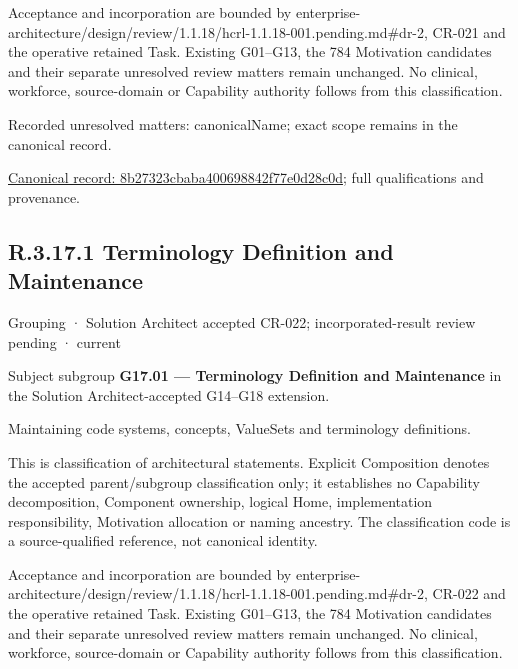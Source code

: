 Acceptance and incorporation are bounded by enterprise-architecture/design/review/1.1.18/hcrl-1.1.18-001.pending.md\#dr-2, CR-021 and the operative retained Task. Existing G01–G13, the 784 Motivation candidates and their separate unresolved review matters remain unchanged. No clinical, workforce, source-domain or Capability authority follows from this classification.


{\small Recorded unresolved matters: canonicalName; exact scope remains in the canonical record.}\par
{\footnotesize \href{../../../../continuum/grouping/8b27323cbaba400698842f77e0d28c0d.md}{Canonical record: 8b27323cbaba400698842f77e0d28c0d}; full qualifications and provenance.}\par
\subsection*{R.3.17.1 Terminology Definition and Maintenance}
\label{navigation:R.3.17.1}

\label{element:b83d63bb553c4642b26bbc41f66445b3}
{\small Grouping · Solution Architect accepted CR-022; incorporated-result review pending · current}\par

Subject subgroup \textbf{G17.01 — Terminology Definition and Maintenance} in the Solution Architect-accepted G14–G18 extension.



Maintaining code systems, concepts, ValueSets and terminology definitions.



This is classification of architectural statements. Explicit Composition denotes the accepted parent/subgroup classification only; it establishes no Capability decomposition, Component ownership, logical Home, implementation responsibility, Motivation allocation or naming ancestry. The classification code is a source-qualified reference, not canonical identity.



Acceptance and incorporation are bounded by enterprise-architecture/design/review/1.1.18/hcrl-1.1.18-001.pending.md\#dr-2, CR-022 and the operative retained Task. Existing G01–G13, the 784 Motivation candidates and their separate unresolved review matters remain unchanged. No clinical, workforce, source-domain or Capability authority follows from this classification.


